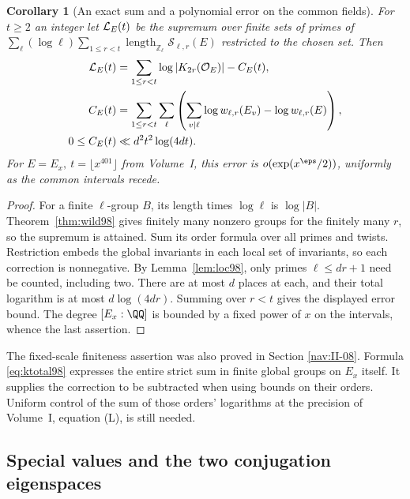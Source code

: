\documentclass[a4paper,11pt]{article}
\newtheorem{corollary}[proposition]{Corollary}
\theoremstyle{definition}
\theoremstyle{remark}
\newcommand{\ZZ}{\mathbb Z}\newcommand{\ord}{\operatorname{ord}}
\newcommand{\len}{\operatorname{length}}\newcommand{\Res}{\operatorname*{Res}}
\numberwithin{equation}{section}
\newcommand{\Sel}{\mathcal S}
\newcommand{\OO}{\mathcal O}
\begin{document}
\begin{corollary}[An exact sum and a polynomial error on the common fields]
\label{cor:sum98}
For \(t\ge2\) an integer let \({\cal L}_E(t)\) be the supremum over
finite sets of primes of
\(\sum_{\ell}(\log\ell)\sum_{1\le r<t}\len_{\ZZ_\ell}\Sel_{\ell,r}(E)\)
restricted to the chosen set. Then
\begin{align}
 {\cal L}_E(t)
    &=\sum_{1\le r<t}\log|K_{2r}(\OO_E)|-C_E(t),                \label{eq:ktotal98}\\
 C_E(t)&=\sum_{1\le r<t}\sum_\ell
       \left(\sum_{v\mid\ell}\log w_{\ell,r}(E_v)-
                                      \log w_{\ell,r}(E)\right), \notag\\
 0\le C_E(t)&\ll d^2t^2\log(4dt).                              \notag
\end{align}
For \(E=E_x,\ t=\lfloor x^{401}\rfloor\) from Volume~I, this error
is \(o(\exp(x^\eps/2))\), uniformly as the common intervals recede.
\end{corollary}
\begin{proof}
For a finite \(\ell\)-group \(B\), its length times \(\log\ell\)
is \(\log|B|\). Theorem~\ref{thm:wild98} gives finitely many
nonzero groups for the finitely many \(r\), so the supremum is
attained. Sum its order formula over all primes and twists.
Restriction embeds the global invariants in each local set of
invariants, so each correction is nonnegative. By Lemma~\ref{lem:loc98},
only primes \(\ell\le dr+1\) need be counted, including two. There
are at most \(d\) places at each, and their total logarithm is
at most \(d\log(4dr)\). Summing over \(r<t\) gives the displayed
error bound. The degree \([E_x:\QQ]\) is bounded by a fixed
power of \(x\) on the intervals, whence the last assertion.
\end{proof}

The fixed-scale finiteness assertion was also proved in Section \ref{nav:II-08}. Formula \eqref{eq:ktotal98} expresses the entire strict sum in
finite global groups on \(E_x\) itself. It supplies the correction
to be subtracted when using bounds on their orders. Uniform control
of the sum of those orders' logarithms at the precision of
Volume~I, equation (L), is still needed.

\subsection{Special values and the two conjugation eigenspaces}\label{nav:III-13}
\label{sec:critical99}
\end{document}
